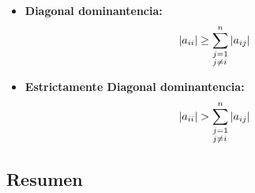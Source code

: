 \documentclass[../main.tex]{subfiles}
\begin{document}
        \begin{itemize}
            \item \textbf{Diagonal dominantencia:} 
                \begin{equation}
                    |a_{ii}| \geq \sum_{\begin{subarray}{l}
                        j= 1 \\
                        j \neq i
                    \end{subarray}
                }^{n} |a_{ij}|
                \end{equation}

            \item \textbf{Estrictamente Diagonal dominantencia:} 
                \begin{equation}
                    |a_{ii}| > \sum_{\begin{subarray}{l}
                        j= 1 \\
                        j \neq i
                    \end{subarray}
                }^{n} |a_{ij}|
                \end{equation}
         \end{itemize}

    \subsection{Resumen}
\end{document}
